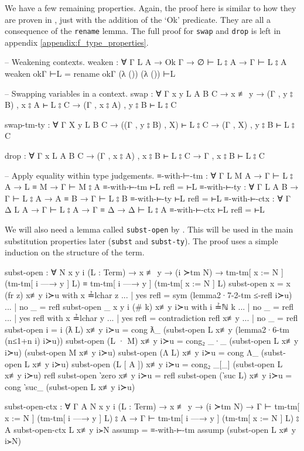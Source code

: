 \documentclass[logo,bsc,singlespacing,parskip,online]{infthesis}
\begin{document}
We have a few remaining properties. Again, the proof here is similar to how they are proven in
\citet{wadler_programming_2022}, just with the addition of the `Ok' predicate. They are all a
consequence of the \texttt{rename} lemma. The full proof for \texttt{swap} and \texttt{drop} is left
in appendix \ref{appendix:f_type_properties}.
\begin{code}
  -- Weakening contexts.
  weaken : ∀ {Γ L A} → Ok Γ → ∅ ⊢ L ⦂ A → Γ ⊢ L ⦂ A
  weaken okΓ ⊢L = rename okΓ (λ ()) (λ ()) ⊢L

  -- Swapping variables in a context.
  swap : ∀ {Γ x y L A B C}
    → x ≢ y
    → (Γ , y ⦂ B) , x ⦂ A ⊢ L ⦂ C
    → (Γ , x ⦂ A) , y ⦂ B ⊢ L ⦂ C

  swap-tm-ty : ∀ {Γ X y L B C}
    → ((Γ , y ⦂ B) , X) ⊢ L ⦂ C
    → (Γ , X) , y ⦂ B ⊢ L ⦂ C

  drop : ∀ {Γ x L A B C}
    → (Γ , x ⦂ A) , x ⦂ B ⊢ L ⦂ C
    → Γ , x ⦂ B ⊢ L ⦂ C

  -- Apply equality within type judgements.
  ≡-with-⊢-tm : ∀ {Γ L M A} → Γ ⊢ L ⦂ A → L ≡ M → Γ ⊢ M ⦂ A
  ≡-with-⊢-tm ⊢L refl = ⊢L
  ≡-with-⊢-ty : ∀ {Γ L A B} → Γ ⊢ L ⦂ A → A ≡ B → Γ ⊢ L ⦂ B
  ≡-with-⊢-ty ⊢L refl = ⊢L
  ≡-with-⊢-ctx : ∀ {Γ Δ L A} → Γ ⊢ L ⦂ A → Γ ≡ Δ → Δ ⊢ L ⦂ A
  ≡-with-⊢-ctx ⊢L refl = ⊢L
\end{code}

We will also need a lemma called \texttt{subst-open} by \citet{chargueraud_locally_2012}. This will
be used in the main substitution properties later (\texttt{subst} and \texttt{subst-ty}). The proof
uses a simple induction on the structure of the term.
\begin{code}
  subst-open : ∀ {N x y i} (L : Term)
    → x ≢ y → (i ≻tm N)
    → tm-tm[ x := N ] (tm-tm[ i —→ y ] L)
      ≡ tm-tm[ i —→ y ] (tm-tm[ x := N ] L)
  subst-open {x = x} (fr z) x≢y i≻u with x ≟lchar z
  ... | yes refl = sym (lemma2·7-2-tm ≤-refl i≻u)
  ... | no  _    = refl
  subst-open {_} {x} {y} {i} (# k) x≢y i≻u with i ≟ℕ k
  ... | no  _ = refl
  ... | yes refl with x ≟lchar y
  ...    | yes refl = contradiction refl x≢y
  ...    | no  _    = refl
  subst-open {i = i} (ƛ L) x≢y i≻u = cong ƛ_
    (subst-open L x≢y (lemma2·6-tm (n≤1+n i) i≻u))
  subst-open (L · M) x≢y i≻u = cong₂ _·_
    (subst-open L x≢y i≻u) (subst-open M x≢y i≻u)
  subst-open (Λ L) x≢y i≻u = cong Λ_ (subst-open L x≢y i≻u)
  subst-open (L [ A ]) x≢y i≻u =
    cong₂ _[_] (subst-open L x≢y i≻u) refl
  subst-open ‵zero x≢y i≻u = refl
  subst-open (‵suc L) x≢y i≻u = cong ‵suc_ (subst-open L x≢y i≻u)

  subst-open-ctx : ∀ {Γ A N x y i} (L : Term)
    → x ≢ y → (i ≻tm N)
    → Γ ⊢ tm-tm[ x := N ] (tm-tm[ i —→ y ] L) ⦂ A
    → Γ ⊢ tm-tm[ i —→ y ] (tm-tm[ x := N ] L) ⦂ A
  subst-open-ctx L x≢y i≻N assump =
    ≡-with-⊢-tm assump (subst-open L x≢y i≻N)
\end{code}
\end{document}

